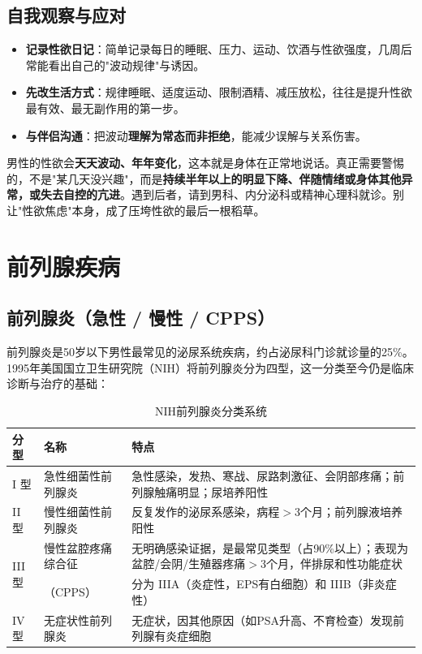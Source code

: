 \subsection{自我观察与应对}

\begin{itemize}
	\item \textbf{记录性欲日记}：简单记录每日的睡眠、压力、运动、饮酒与性欲强度，几周后常能看出自己的"波动规律"与诱因。
	\item \textbf{先改生活方式}：规律睡眠、适度运动、限制酒精、减压放松，往往是提升性欲最有效、最无副作用的第一步。
	\item \textbf{与伴侣沟通}：把波动\textbf{理解为常态而非拒绝}，能减少误解与关系伤害。
\end{itemize}

\begin{tcolorbox}[colback=blue!5!white,colframe=blue!50!black,title=贴心小叮咛]
男性的性欲会\textbf{天天波动、年年变化}，这本就是身体在正常地说话。真正需要警惕的，不是"某几天没兴趣"，而是\textbf{持续半年以上的明显下降、伴随情绪或身体其他异常，或失去自控的亢进}。遇到后者，请到男科、内分泌科或精神心理科就诊。别让"性欲焦虑"本身，成了压垮性欲的最后一根稻草。
\end{tcolorbox}


\section{前列腺疾病}

\subsection{前列腺炎（急性 / 慢性 / CPPS）}

前列腺炎是50岁以下男性最常见的泌尿系统疾病，约占泌尿科门诊就诊量的25\%。1995年美国国立卫生研究院（NIH）将前列腺炎分为四型，这一分类至今仍是临床诊断与治疗的基础：

\begin{table}[htbp]
\centering
\caption{NIH前列腺炎分类系统}
\label{tab:prostatitis_nih}
\begin{tabularx}{\textwidth}{@{}llX@{}}
    \toprule
    \textbf{分型} & \textbf{名称} & \textbf{特点} \\
    \midrule
    I 型 & 急性细菌性前列腺炎 & 急性感染，发热、寒战、尿路刺激征、会阴部疼痛；前列腺触痛明显；尿培养阳性 \\
    II 型 & 慢性细菌性前列腺炎 & 反复发作的泌尿系感染，病程$>$3个月；前列腺液培养阳性 \\
    \multirow{2}{*}{III 型} & 慢性盆腔疼痛综合征 & 无明确感染证据，是最常见类型（占90\%以上）；表现为盆腔/会阴/生殖器疼痛$>$3个月，伴排尿和性功能症状 \\
     & （CPPS） & 分为 IIIA（炎症性，EPS有白细胞）和 IIIB（非炎症性） \\
    IV 型 & 无症状性前列腺炎 & 无症状，因其他原因（如PSA升高、不育检查）发现前列腺有炎症细胞 \\
    \bottomrule
\end{tabularx}
\end{table}

